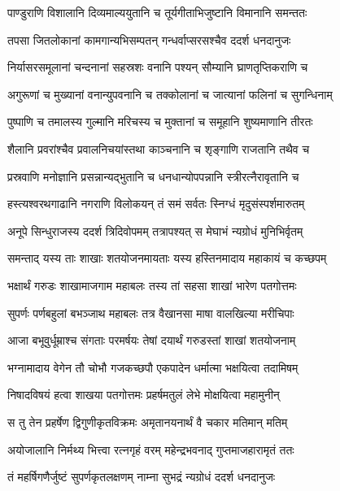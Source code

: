 \twolineshloka
{पाण्डुराणि विशालानि दिव्यमाल्ययुतानि च}
{तूर्यगीताभिजुष्टानि विमानानि समन्ततः} %

\twolineshloka
{तपसा जितलोकानां कामगान्यभिसम्पतन्}
{गन्धर्वाप्सरसश्चैव ददर्श धनदानुजः} %

\twolineshloka
{निर्यासरसमूलानां चन्दनानां सहस्रशः}
{वनानि पश्यन् सौम्यानि घ्राणतृप्तिकराणि च} %

\twolineshloka
{अगुरूणां च मुख्यानां वनान्युपवनानि च}
{तक्कोलानां च जात्यानां फलिनां च सुगन्धिनाम्} %

\twolineshloka
{पुष्पाणि च तमालस्य गुल्मानि मरिचस्य च}
{मुक्तानां च समूहानि शुष्यमाणानि तीरतः} %

\twolineshloka
{शैलानि प्रवरांश्चैव प्रवालनिचयांस्तथा}
{काञ्चनानि च शृङ्गाणि राजतानि तथैव च} %

\twolineshloka
{प्रस्रवाणि मनोज्ञानि प्रसन्नान्यद्भुतानि च}
{धनधान्योपपन्नानि स्त्रीरत्नैरावृतानि च} %

\twolineshloka
{हस्त्यश्वरथगाढानि नगराणि विलोकयन्}
{तं समं सर्वतः स्निग्धं मृदुसंस्पर्शमारुतम्} %

\twolineshloka
{अनूपे सिन्धुराजस्य ददर्श त्रिदिवोपमम्}
{तत्रापश्यत् स मेघाभं न्यग्रोधं मुनिभिर्वृतम्} %

\twolineshloka
{समन्ताद् यस्य ताः शाखाः शतयोजनमायताः}
{यस्य हस्तिनमादाय महाकायं च कच्छपम्} %

\twolineshloka
{भक्षार्थं गरुडः शाखामाजगाम महाबलः}
{तस्य तां सहसा शाखां भारेण पतगोत्तमः} %

\twolineshloka
{सुपर्णः पर्णबहुलां बभञ्जाथ महाबलः}
{तत्र वैखानसा माषा वालखिल्या मरीचिपाः} %

\twolineshloka
{आजा बभूवुर्धूम्राश्च संगताः परमर्षयः}
{तेषां दयार्थं गरुडस्तां शाखां शतयोजनाम्} %

\twolineshloka
{भग्नामादाय वेगेन तौ चोभौ गजकच्छपौ}
{एकपादेन धर्मात्मा भक्षयित्वा तदामिषम्} %

\twolineshloka
{निषादविषयं हत्वा शाखया पतगोत्तमः}
{प्रहर्षमतुलं लेभे मोक्षयित्वा महामुनीन्} %

\twolineshloka
{स तु तेन प्रहर्षेण द्विगुणीकृतविक्रमः}
{अमृतानयनार्थं वै चकार मतिमान् मतिम्} %

\twolineshloka
{अयोजालानि निर्मथ्य भित्त्वा रत्नगृहं वरम्}
{महेन्द्रभवनाद् गुप्तमाजहारामृतं ततः} %

\twolineshloka
{तं महर्षिगणैर्जुष्टं सुपर्णकृतलक्षणम्}
{नाम्ना सुभद्रं न्यग्रोधं ददर्श धनदानुजः} %

